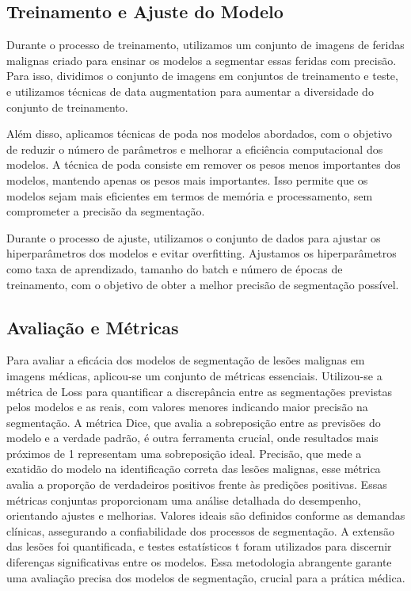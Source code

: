 \subsection{Treinamento e Ajuste do Modelo}
    Durante o processo de treinamento, utilizamos um conjunto de imagens de feridas malignas criado para ensinar os modelos a segmentar essas feridas com precisão. Para isso, dividimos o conjunto de imagens em conjuntos de treinamento e teste, e utilizamos técnicas de data augmentation para aumentar a diversidade do conjunto de treinamento.

    Além disso, aplicamos técnicas de poda nos modelos abordados, com o objetivo de reduzir o número de parâmetros e melhorar a eficiência computacional dos modelos. A técnica de poda consiste em remover os pesos menos importantes dos modelos, mantendo apenas os pesos mais importantes. Isso permite que os modelos sejam mais eficientes em termos de memória e processamento, sem comprometer a precisão da segmentação.

    Durante o processo de ajuste, utilizamos o conjunto de dados para ajustar os hiperparâmetros dos modelos e evitar overfitting. Ajustamos os hiperparâmetros como taxa de aprendizado, tamanho do batch e número de épocas de treinamento, com o objetivo de obter a melhor precisão de segmentação possível.

\subsection{Avaliação e Métricas}
    Para avaliar a eficácia dos modelos de segmentação de lesões malignas em imagens médicas, aplicou-se um conjunto de métricas essenciais. Utilizou-se a métrica de Loss para quantificar a discrepância entre as segmentações previstas pelos modelos e as reais, com valores menores indicando maior precisão na segmentação. A métrica Dice, que avalia a sobreposição entre as previsões do modelo e a verdade padrão, é outra ferramenta crucial, onde resultados mais próximos de 1 representam uma sobreposição ideal. Precisão, que mede a exatidão do modelo na identificação correta das lesões malignas, esse métrica avalia a proporção de verdadeiros positivos frente às predições positivas. Essas métricas conjuntas proporcionam uma análise detalhada do desempenho, orientando ajustes e melhorias. Valores ideais são definidos conforme as demandas clínicas, assegurando a confiabilidade dos processos de segmentação. A extensão das lesões foi quantificada, e testes estatísticos t foram utilizados para discernir diferenças significativas entre os modelos. Essa metodologia abrangente garante uma avaliação precisa dos modelos de segmentação, crucial para a prática médica.

